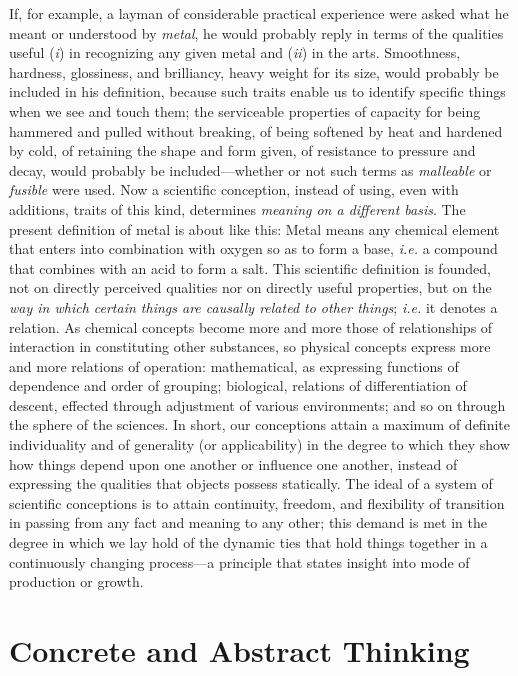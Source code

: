 \documentclass[letterpaper]{book}
\begin{document}
If, for example, a layman of considerable practical experience were
asked what he meant or understood by \emph{metal}, he would probably
reply in terms of the qualities useful (\emph{i}) in recognizing any
given metal and (\emph{ii}) in the arts. Smoothness, hardness,
glossiness, and brilliancy, heavy weight for its size, would probably be
included in his definition, because such traits enable us to identify
specific things when we see and touch them; the serviceable properties
of capacity for being hammered and pulled without breaking, of being
softened by heat and hardened by cold, of retaining the shape and
form
given, of resistance to pressure and decay, would probably be
included---whether or not such terms as \emph{malleable} or
\emph{fusible} were used. Now a scientific conception, instead of using,
even with additions, traits of this kind, determines \emph{meaning on a
different basis}. The present definition of metal is about like this:
Metal means any chemical element that enters into combination with
oxygen so as to form a base, \emph{i.e.} a compound that combines with
an acid to form a salt. This scientific definition is founded, not on
directly perceived qualities nor on directly useful properties, but on
the \emph{way in which certain things are causally related to other
things}; \emph{i.e.} it denotes a relation. As chemical concepts become
more and more those of relationships of interaction in constituting
other substances, so physical concepts express more and more relations
of operation: mathematical, as expressing functions of dependence and
order of grouping; biological, relations of differentiation of descent,
effected through adjustment of various environments; and so on through
the sphere of the sciences. In short, our conceptions attain a maximum
of definite individuality and of generality (or applicability) in the
degree to which they show how things depend upon one another or
influence one another, instead of expressing the qualities that objects
possess statically. The ideal of a system of scientific conceptions is
to attain continuity, freedom, and flexibility of transition in passing
from any fact and meaning to any other; this demand is met in the degree
in which we lay hold of the dynamic ties that hold things together in a
continuously changing process---a principle that states insight into
mode of production or
growth.

\chapter{Concrete and Abstract Thinking}
\end{document}
